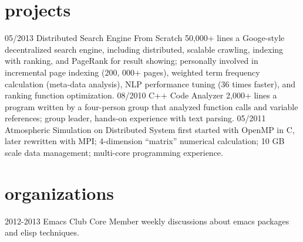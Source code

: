 \documentclass[]{friggeri-cv}
\begin{document}
\section{projects}
\begin{entrylist}
  \entry
  {05/2013}
  {Distributed Search Engine From Scratch}
  {50,000+ lines}
  {a Googe-style decentralized search engine, including distributed, scalable crawling, indexing with ranking, and PageRank for result showing; personally involved in incremental page indexing (200, 000+ pages), weighted term frequency calculation (meta-data analysis), NLP performance tuning (36 times faster), and ranking function optimization.}
  \entry
  {08/2010}
  {C++ Code Analyzer}
  {2,000+ lines}
  {a program written by a four-person group that analyzed function calls and variable references; group leader, hands-on experience with text parsing.}
  \entry
  {05/2011}
  {Atmospheric Simulation on Distributed System}
  {}
  {first started with OpenMP in C, later rewritten with MPI; 4-dimension “matrix” numerical calculation; 10 GB scale data management; multi-core programming experience.}
\end{entrylist}
\section{organizations}
\begin{entrylist}
  \entry
  {2012-2013}
  {Emacs Club}
  {Core Member}
  {weekly discussions about emacs packages and elisp techniques.}
\end{entrylist}
\end{document}
